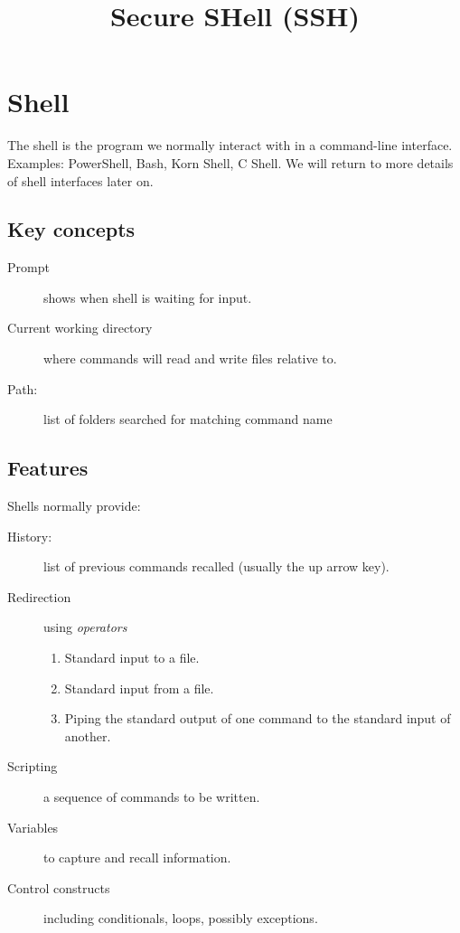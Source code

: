 \documentclass{pgnotes}
\title{Secure SHell (SSH)}
\begin{document}
\maketitle

\section{Shell}

The shell is the program we normally interact with in a command-line interface.
Examples: PowerShell, Bash, Korn Shell, C Shell.
We will return to more details of shell interfaces later on. 

\subsection{Key concepts}

\begin{description}
\item[Prompt] shows when shell is waiting for input.
\item[Current working directory] where commands will read and write files relative to.
\item[Path:] list of folders searched for matching command name
\end{description}

\subsection{Features}

Shells normally provide:

\begin{description}
\item[History:] list of previous commands recalled (usually the up arrow key).
\item[Redirection] using \textit{operators}
  \begin{enumerate}
  \item Standard input to a file.  
  \item Standard input from a file.
  \item Piping the standard output of one command to the standard input of another.
  \end{enumerate}
\item[Scripting] a sequence of commands to be written.
\item[Variables] to capture and recall information.
\item[Control constructs] including conditionals, loops, possibly exceptions.
\end{description}
\end{document}

